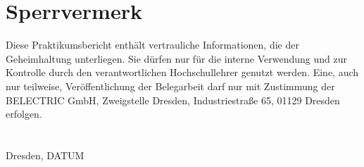 \chapter*{Sperrvermerk}\thispagestyle{empty}

Diese Praktikumsbericht enthält vertrauliche Informationen, die der Geheimhaltung unterliegen. Sie dürfen nur für die interne Verwendung und zur Kontrolle durch den verantwortlichen Hochschullehrer genutzt werden. Eine, auch nur teilweise, Veröffentlichung der Belegarbeit darf nur mit Zustimmung der BELECTRIC GmbH, Zweigstelle Dresden, Industriestraße 65, 01129 Dresden erfolgen.
\\ 
\\
\\
{\LARGE Dresden, DATUM}\\

